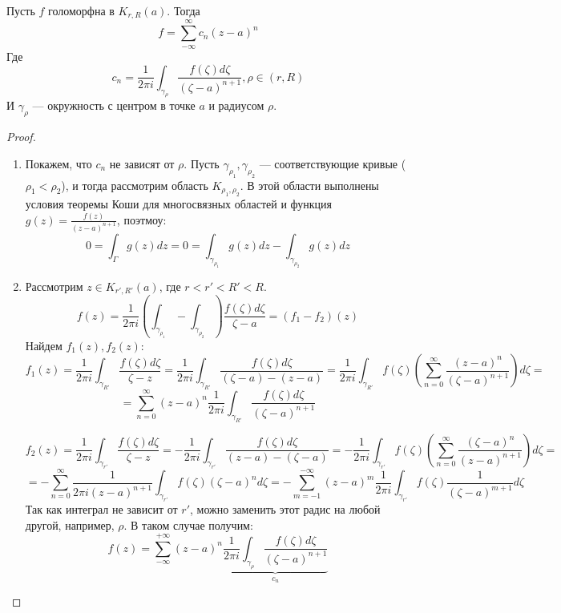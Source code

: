 \begin{theorem}
    Пусть \(f\) голоморфна в \(K_{r, R}(a)\). Тогда
    \[f = \sum_{-\infty}^\infty c_n(z - a)^n\]
    Где 
    \[c_n = \frac{1}{2\pi i}\int_{\gamma_\rho}\frac{f(\zeta)d\zeta}{(\zeta - a)^{n + 1}}, \rho \in (r, R)\]
    И \(\gamma_\rho\) --- окружность с центром в точке \(a\) и радиусом \(\rho\).
\end{theorem}
\begin{proof}
    \begin{enumerate}
        \item Покажем, что \(c_n\) не зависят от \(\rho\). Пусть \(\gamma_{\rho_1}, \gamma_{\rho_2}\) --- соответствующие кривые (\(\rho_1 < \rho_2\)), и тогда рассмотрим область \(K_{\rho_1, \rho_2}\). В этой области выполнены условия теоремы Коши для многосвязных областей и функция \(g(z) = \frac{f(z)}{(z - a)^{n + 1}}\), поэтмоу:
        \[0 = \int_\Gamma g(z)dz = 0 = \int_{\gamma_{\rho_1}} g(z)dz - \int_{\gamma_{\rho_2}} g(z)dz\]
        \item Рассмотрим \(z \in K_{r', R'}(a)\), где \(r < r' < R' < R\).
        \[f(z) = \frac{1}{2\pi i}\left( \int_{\gamma_{\rho_1}} - \int_{\gamma_{\rho_2}} \right) \frac{f(\zeta)d\zeta}{\zeta - a} = (f_1 - f_2)(z)\]
        Найдем \(f_1(z), f_2(z)\):
        \[f_1(z) = \frac{1}{2\pi i}\int_{\gamma_{R'}} \frac{f(\zeta)d\zeta}{\zeta - z} = \frac{1}{2\pi i}\int_{\gamma_{R'}}\frac{f(\zeta)d\zeta}{(\zeta - a) - (z - a)} = \frac{1}{2\pi i}\int_{\gamma_{R'}}f(\zeta)\left( \sum_{n = 0}^\infty \frac{(z - a)^n}{(\zeta - a)^{n + 1}} \right)d\zeta =\]
        \[= \sum_{n = 0}^\infty (z - a)^n\frac{1}{2\pi i}\int_{\gamma_{R'}}\frac{f(\zeta)d\zeta}{(\zeta - a)^{n + 1}}\]

        \[f_2(z) = \frac{1}{2\pi i}\int_{\gamma_{r'}} \frac{f(\zeta)d\zeta}{\zeta - z} = -\frac{1}{2\pi i}\int_{\gamma_{r'}}\frac{f(\zeta)d\zeta}{(z - a) - (\zeta - a)} = -\frac{1}{2\pi i}\int_{\gamma_{r'}}f(\zeta)\left( \sum_{n = 0}^\infty \frac{(\zeta - a)^n}{(z - a)^{n + 1}} \right)d\zeta =\]
        \[= -\sum_{n = 0}^\infty \frac{1}{2\pi i (z - a)^{n + 1}}\int_{\gamma_{r'}}f(\zeta)(\zeta - a)^nd\zeta = -\sum_{m = -1}^{-\infty} (z - a)^m\frac{1}{2\pi i}\int_{\gamma_{r'}} f(\zeta)\frac{1}{(\zeta - a)^{m + 1}}d\zeta\]
        Так как интеграл не зависит от \(r'\), можно заменить этот радис на любой другой, например, \(\rho\). В таком случае получим:
        \[f(z) = \sum_{-\infty}^{+\infty}(z - a)^n\underbrace{\frac{1}{2\pi i}\int_{\gamma_\rho}\frac{f(\zeta)d\zeta}{(\zeta - a)^{n + 1}}}_{c_n}\]
    \end{enumerate}
\end{proof}


